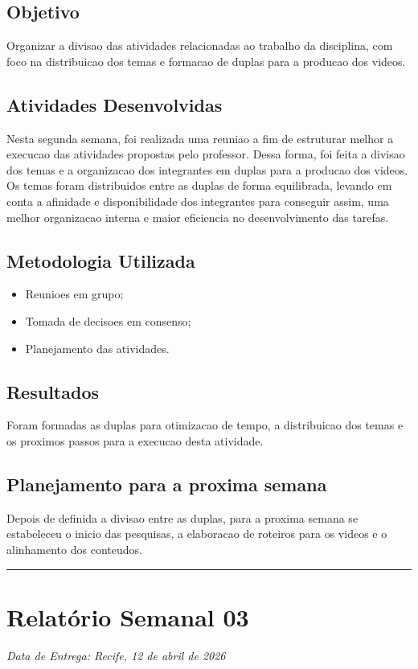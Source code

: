\subsection{Objetivo}
Organizar a divisao das atividades relacionadas ao trabalho da disciplina, com foco na distribuicao dos temas e formacao de duplas para a producao dos videos.

\subsection{Atividades Desenvolvidas}
Nesta segunda semana, foi realizada uma reuniao a fim de estruturar melhor a execucao das atividades propostas pelo professor. Dessa forma, foi feita a divisao dos temas e a organizacao dos integrantes em duplas para a producao dos videos. Os temas foram distribuidos entre as duplas de forma equilibrada, levando em conta a afinidade e disponibilidade dos integrantes para conseguir assim, uma melhor organizacao interna e maior eficiencia no desenvolvimento das tarefas.

\subsection{Metodologia Utilizada}
\begin{itemize}
    \item Reunioes em grupo;
    \item Tomada de decisoes em consenso;
    \item Planejamento das atividades.
\end{itemize}

\subsection{Resultados}
Foram formadas as duplas para otimizacao de tempo, a distribuicao dos temas e os proximos passos para a execucao desta atividade.

\subsection{Planejamento para a proxima semana}
Depois de definida a divisao entre as duplas, para a proxima semana se estabeleceu o inicio das pesquisas, a elaboracao de roteiros para os videos e o alinhamento dos conteudos.

\bigskip
\hrule
\bigskip

\section{Relatório Semanal 03}
{\centering\noindent\textit{Data de Entrega: Recife, 12 de abril de 2026}\par}\bigskip

